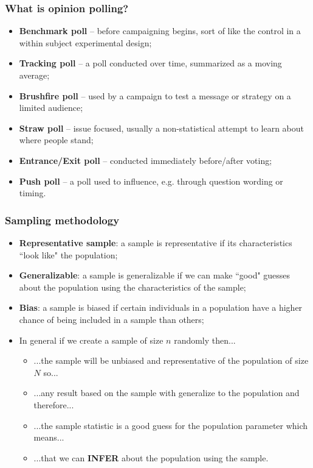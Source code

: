 \documentclass[aspectratio=169]{beamer}
\theoremstyle{principle}
\begin{document}
\begin{frame}
\frametitle{What is opinion polling?}

\begin{itemize}
\item \textbf{Benchmark poll} -- before campaigning begins, sort of like the control in a within subject experimental design;
\bigskip

\item \textbf{Tracking poll} -- a poll conducted over time, summarized as a moving average;
\bigskip

\item \textbf{Brushfire poll} -- used by a campaign to test a message or strategy on a limited audience;
\bigskip

\item \textbf{Straw poll} -- issue focused, usually a non-statistical attempt to learn about where people stand;
\bigskip

\item \textbf{Entrance/Exit poll} -- conducted immediately before/after voting;
\bigskip

\item \textbf{Push poll} -- a poll used to influence, e.g. through question wording or timing.
\end{itemize}

\end{frame}

\begin{frame}
\frametitle{Sampling methodology}

\begin{itemize}
\item \textbf{Representative sample}: a sample is representative if its characteristics ``look like" the population;
\bigskip
\item \textbf{Generalizable}: a sample is generalizable if we can make ``good" guesses about the population using the characteristics of the sample;
\bigskip
\item \textbf{Bias}: a sample is biased if certain individuals in a population have a higher chance of being included in a sample than others;
\bigskip
\item[]\color{white} In general if we create a sample of size $n$ randomly then...
\begin{itemize}
\item[]\color{white} ...the sample will be unbiased and representative of the population of size $N$ so...
\item[]\color{white} ...any result based on the sample with generalize to the population and therefore...
\item[]\color{white} ...the sample statistic is a good guess for the population parameter which means...
\item[]\color{white} ...that we can \textbf{INFER} about the population using the sample.
\end{itemize}

\end{itemize}

\end{frame}
\end{document}
